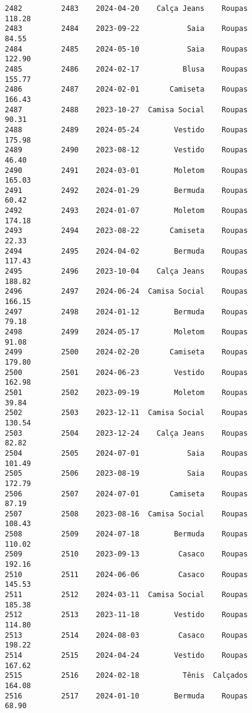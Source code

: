 \documentclass[11pt]{article}
\begin{document}
\begin{Verbatim}[commandchars=\\\{\}]
2482         2483    2024-04-20    Calça Jeans    Roupas          118.28   
2483         2484    2023-09-22           Saia    Roupas           84.55   
2484         2485    2024-05-10           Saia    Roupas          122.90   
2485         2486    2024-02-17          Blusa    Roupas          155.77   
2486         2487    2024-02-01       Camiseta    Roupas          166.43   
2487         2488    2023-10-27  Camisa Social    Roupas           90.31   
2488         2489    2024-05-24        Vestido    Roupas          175.98   
2489         2490    2023-08-12        Vestido    Roupas           46.40   
2490         2491    2024-03-01        Moletom    Roupas          165.03   
2491         2492    2024-01-29        Bermuda    Roupas           60.42   
2492         2493    2024-01-07        Moletom    Roupas          174.18   
2493         2494    2023-08-22       Camiseta    Roupas           22.33   
2494         2495    2024-04-02        Bermuda    Roupas          117.43   
2495         2496    2023-10-04    Calça Jeans    Roupas          188.82   
2496         2497    2024-06-24  Camisa Social    Roupas          166.15   
2497         2498    2024-01-12        Bermuda    Roupas           79.18   
2498         2499    2024-05-17        Moletom    Roupas           91.08   
2499         2500    2024-02-20       Camiseta    Roupas          179.80   
2500         2501    2024-06-23        Vestido    Roupas          162.98   
2501         2502    2023-09-19        Moletom    Roupas           39.84   
2502         2503    2023-12-11  Camisa Social    Roupas          130.54   
2503         2504    2023-12-24    Calça Jeans    Roupas           82.82   
2504         2505    2024-07-01           Saia    Roupas          101.49   
2505         2506    2023-08-19           Saia    Roupas          172.79   
2506         2507    2024-07-01       Camiseta    Roupas           87.19   
2507         2508    2023-08-16  Camisa Social    Roupas          108.43   
2508         2509    2024-07-18        Bermuda    Roupas          110.02   
2509         2510    2023-09-13         Casaco    Roupas          192.16   
2510         2511    2024-06-06         Casaco    Roupas          145.53   
2511         2512    2024-03-11  Camisa Social    Roupas          185.38   
2512         2513    2023-11-18        Vestido    Roupas          114.80   
2513         2514    2024-08-03         Casaco    Roupas          198.22   
2514         2515    2024-04-24        Vestido    Roupas          167.62   
2515         2516    2024-02-18          Tênis  Calçados          164.08   
2516         2517    2024-01-10        Bermuda    Roupas           68.90   

\end{Verbatim}
\end{document}
